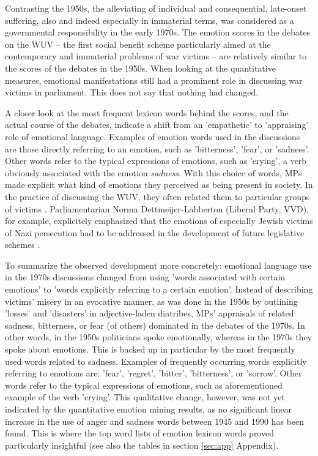 \documentclass{dhbenelux}
\begin{document}
Contrasting the 1950s, the alleviating of individual and consequential, late-onset suffering, also and indeed especially in immaterial terms, was considered as a governmental responsibility in the early 1970s. The emotion scores in the debates on the WUV – the first social benefit scheme particularly aimed at the contemporary and immaterial problems of war victims – are relatively similar to the scores of the debates in the 1950s. When looking at the quantitative measures, emotional manifestations still had a prominent role in discussing war victims in parliament. This does not say that nothing had changed.

A closer look at the most frequent lexicon words behind the scores, and the actual course of the debates, indicate a shift from an 'empathetic' to 'appraising' role of emotional language. Examples of emotion words used in the discussions are those directly referring to an emotion, such as 'bitterness', 'fear', or 'sadness'. Other words refer to the typical expressions of emotions, such as 'crying', a verb obviously associated with the emotion {\em sadness}. With this choice of words, MPs made explicit what kind of emotions they perceived as being present in society. In the practice of discussing the WUV, they often related them to particular groups of victims  \citep[p.101]{noauthor_handelingen_19691970-1}. Parliamentarian Norma Dettmeijer-Labberton (Liberal Party, VVD), for example, explicitely emphasized that the emotions of especially Jewish victims of Nazi persecution had to be addressed in the development of future legislative schemes  \citep[p.3473–74, 3490–91]{noauthor_handelingen_1970-1971-2}. 

To summarize the observed development more concretely: emotional language use in the 1970s discussions changed from using 'words associated with certain emotions' to 'words explicitly referring to a certain emotion'. Instead of describing victims' misery in an evocative manner, as was done in the 1950s by outlining 'losses' and 'disasters' in adjective-laden diatribes, MPs' appraisals of related sadness, bitterness, or fear (of others) dominated in the debates of the 1970s. In other words, in the 1950s politicians spoke emotionally, whereas in the 1970s they spoke about emotions. This is backed up in particular by the most frequently used words related to sadness. Examples of frequently occurring words explicitly referring to emotions are: 'fear', 'regret', 'bitter', 'bitterness', or 'sorrow'. Other words refer to the typical expressions of emotions, such as aforementioned example of the verb 'crying'. This qualitative change, however, was not yet indicated by the quantitative emotion mining results, as no significant linear increase in the use of anger and sadness words between 1945 and 1990 has been found. This is where the top word lists of emotion lexicon words proved particularly insightful (see also the tables in section \ref{sec:app} Appendix).
\end{document}
